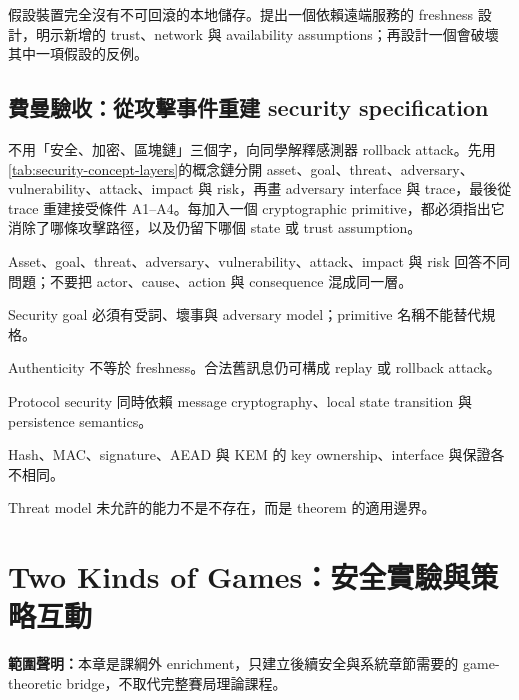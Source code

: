 \documentclass[11pt,a4paper,oneside,openany]{book}
\begin{document}
\begin{exercise}
假設裝置完全沒有不可回滾的本地儲存。提出一個依賴遠端服務的 freshness 設計，明示新增的 trust、network 與 availability assumptions；再設計一個會破壞其中一項假設的反例。
\end{exercise}

\section{費曼驗收：從攻擊事件重建 security specification}
\begin{feynmancheck}
不用「安全、加密、區塊鏈」三個字，向同學解釋感測器 rollback attack。先用\cref{tab:security-concept-layers}的概念鏈分開 asset、goal、threat、adversary、vulnerability、attack、impact 與 risk，再畫 adversary interface 與 trace，最後從 trace 重建接受條件 A1--A4。每加入一個 cryptographic primitive，都必須指出它消除了哪條攻擊路徑，以及仍留下哪個 state 或 trust assumption。
\end{feynmancheck}
\begin{chapterrecap}
\item Asset、goal、threat、adversary、vulnerability、attack、impact 與 risk 回答不同問題；不要把 actor、cause、action 與 consequence 混成同一層。
\item Security goal 必須有受詞、壞事與 adversary model；primitive 名稱不能替代規格。
\item Authenticity 不等於 freshness。合法舊訊息仍可構成 replay 或 rollback attack。
\item Protocol security 同時依賴 message cryptography、local state transition 與 persistence semantics。
\item Hash、MAC、signature、AEAD 與 KEM 的 key ownership、interface 與保證各不相同。
\item Threat model 未允許的能力不是不存在，而是 theorem 的適用邊界。
\end{chapterrecap}

\chapter{Two Kinds of Games：安全實驗與策略互動}
\label{app:two-games}
\noindent\textbf{範圍聲明：}本章是課綱外 enrichment，只建立後續安全與系統章節需要的 game-theoretic bridge，不取代完整賽局理論課程。
\end{document}

